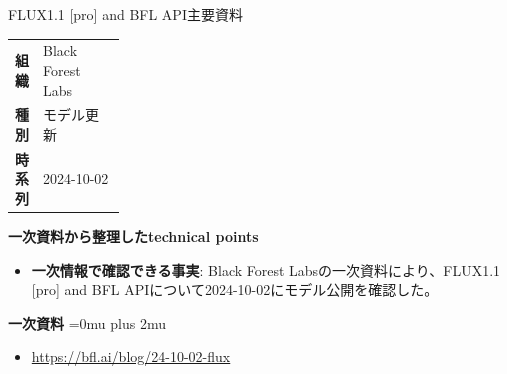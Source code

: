 \begin{technicalnote}{FLUX1.1 [pro] and BFL API}{主要資料}
\begingroup
\begin{tabularx}{\linewidth}{@{}>{\bfseries}p{0.22\linewidth}X@{}}
組織 & Black Forest Labs \\
種別 & モデル更新 \\
時系列 & 2024-10-02 \\
\end{tabularx}
\smallskip
{\bfseries 一次資料から整理したtechnical points}
\begin{itemize}[leftmargin=1.5em,itemsep=0.35em]
\item \textbf{一次情報で確認できる事実}: Black Forest Labsの一次資料により、FLUX1.1 [pro] and BFL APIについて2024-10-02にモデル公開を確認した。
\end{itemize}
\begin{minipage}{\linewidth}
\begin{samepage}
{\bfseries 一次資料}
\begingroup\sloppy
\Urlmuskip=0mu plus 2mu\relax
\begin{itemize}[leftmargin=1.5em,itemsep=0.25em]
\item {\scriptsize\url{https://bfl.ai/blog/24-10-02-flux}}
\end{itemize}
\endgroup
\end{samepage}
\end{minipage}
\endgroup
\end{technicalnote}
\medskip


